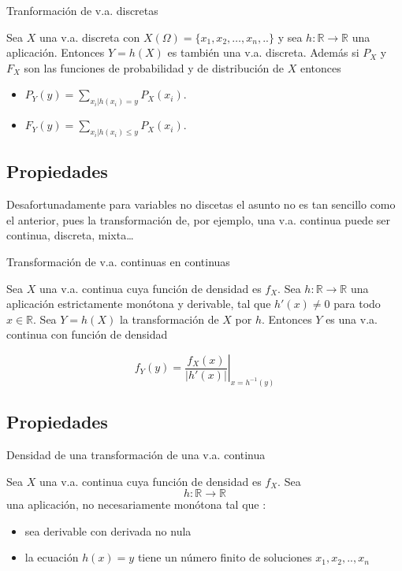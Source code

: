 \documentclass[]{book}
\providecommand{\tightlist}{%
  \setlength{\itemsep}{0pt}\setlength{\parskip}{0pt}}
\begin{document}
Tranformación de v.a. discretas

Sea \(X\) una v.a. discreta con \(X(\Omega)=\{x_1,x_2,\ldots,x_{n},..\}\) y sea \(h:\mathbb{R}\to\mathbb{R}\) una aplicación.
Entonces \(Y=h(X)\) es también una v.a. discreta. Además si \(P_X\)
y \(F_{X}\) son las funciones de probabilidad y de distribución de
\(X\) entonces

\begin{itemize}
\tightlist
\item
  \(\displaystyle P_{Y}(y)=\sum_{x_{i}|h(x_{i})=y}P_X(x_{i}).\)
\item
  \(\displaystyle F_{Y}(y)=\sum_{x_{i}|h(x_{i})\leq y} P_X(x_{i}).\)
\end{itemize}

\hypertarget{propiedades-20}{%
\subsection{Propiedades}\label{propiedades-20}}

Desafortunadamente para variables no discetas el asunto no es tan sencillo como el anterior, pues la transformación de, por ejemplo, una v.a. continua puede ser continua, discreta, mixta\ldots{}

Transformación de v.a. continuas en continuas

Sea \(X\) una v.a. continua cuya función de densidad es \(f_{X}\). Sea
\(h:\mathbb{R}\to\mathbb{R}\) una aplicación estrictamente monótona y derivable, tal
que \(h'(x)\not=0\) para todo \(x\in\mathbb{R}\). Sea \(Y=h(X)\) la
transformación de \(X\) por \(h\). Entonces \(Y\) es una v.a. continua con función
de densidad

\[f_{Y}(y)=\left.\frac{f_{X}(x)}
{\left|h'(x)\right|}\right|_{x=h^{-1}(y)}\]

\hypertarget{propiedades-21}{%
\subsection{Propiedades}\label{propiedades-21}}

 Densidad de una transformación de una v.a. continua

Sea \(X\) una v.a. continua cuya función de densidad es \(f_{X}\). Sea
\[h:\mathbb{R}\to\mathbb{R}\]
una aplicación, no necesariamente monótona tal que :

\begin{itemize}
\tightlist
\item
  sea derivable con derivada no nula
\item
  la ecuación \(h(x)=y\) tiene un número finito de soluciones
  \(x_1,x_2,..,x_{n}\)
\end{itemize}
\end{document}
